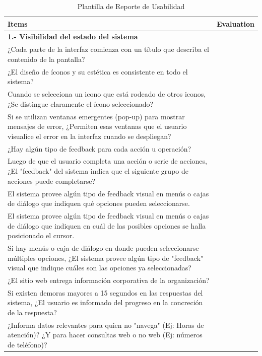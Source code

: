 \documentclass[stu, 12pt, letterpaper, donotrepeattitle, floatsintext, natbib]{apa7}
\begin{document}
\begin{longtable}{|>{\raggedright\arraybackslash}p{10cm}|>{\centering\arraybackslash}p{3cm}|}
    \caption{Plantilla de Reporte de Usabilidad} \label{tab:reporte_usabilidad} \\
    \hline
    \textbf{Items} & \textbf{Evaluation} \\ \hline
    
    \textbf{1.- Visibilidad del estado del sistema} & \\ \hline
    ¿Cada parte de la interfaz comienza con un título que describa el contenido de la pantalla? & \\ \hline
    ¿El diseño de íconos y su estética es consistente en todo el sistema? & \\ \hline
    Cuando se selecciona un icono que está rodeado de otros iconos, ¿Se distingue claramente el ícono seleccionado? & \\ \hline
    Si se utilizan ventanas emergentes (pop-up) para mostrar mensajes de error, ¿Permiten esas ventanas que el usuario visualice el error en la interfaz cuando se despliegan? & \\ \hline
    ¿Hay algún tipo de feedback para cada acción u operación? & \\ \hline
    Luego de que el usuario completa una acción o serie de acciones, ¿El "feedback" del sistema indica que el siguiente grupo de acciones puede completarse? & \\ \hline
    El sistema provee algún tipo de feedback visual en menús o cajas de diálogo que indiquen qué opciones pueden seleccionarse. & \\ \hline
    El sistema provee algún tipo de feedback visual en menús o cajas de diálogo que indiquen en cuál de las posibles opciones se halla posicionado el cursor. & \\ \hline
    Si hay menús o caja de diálogo en donde pueden seleccionarse múltiples opciones, ¿El sistema provee algún tipo de "feedback" visual que indique cuáles son las opciones ya seleccionadas? & \\ \hline
    ¿El sitio web entrega información corporativa de la organización? & \\ \hline
    Si existen demoras mayores a 15 segundos en las respuestas del sistema, ¿El usuario es informado del progreso en la concreción de la respuesta? & \\ \hline
    ¿Informa datos relevantes para quien no "navega" (Ej: Horas de atención)? ¿Y para hacer consultas web o no web (Ej: números de teléfono)? & \\ \hline

\end{longtable}
\end{document}
